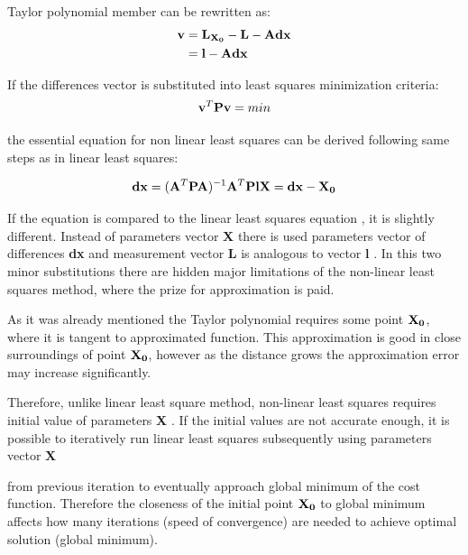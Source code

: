 \documentclass[a4paper,12pt]{article}
\newcommand{\ematr}[1]{
{\bf #1}
}
\newcommand{\evect}[1]{
{\bf #1}
}
\begin{document}
Taylor polynomial member can be rewritten as:
\begin{equation}
\begin{split}
\evect{v} &=  \evect{L_{X_{0}}} - \evect{L} - \ematr{A}\evect{dx} \\
          &= \evect{l} - \ematr{A}\evect{dx}
\end{split}
\end{equation}

If the differences vector is substituted into least squares minimization criteria:
\begin{equation}
\label{eq:min_cond}
\evect{v}^{T}  \ematr{P} \evect{v} = min
\end{equation}

the essential equation for non linear least squares can be derived 
following same steps as in linear least squares:

\begin{equation}
\label{eq:non_least_sq}
\evect{dx} = (\ematr{A}^{T} \ematr{P} \ematr{A})^{-1} \ematr{A}^{T} \ematr{P} \ematr{l}
\evect{X} =  {\evect{dx} -  \evect{X_{0}}}
\label{eq:least_sq}
\end{equation}

If the equation is compared to the linear least squares equation \label{eq:least_sq},
 it is slightly different. Instead of parameters vector \evect{X} there is used 
parameters vector of differences \evect{dx} and measurement vector \evect{L} is analogous to vector \evect{l}. In this two minor 
substitutions there are hidden major limitations of the non-linear least squares method, 
where the prize for approximation is paid. 

As it was already mentioned the Taylor polynomial requires some point $\evect{X_{0}}$, where it is tangent to 
approximated function.
This approximation is good in close surroundings of point $\evect{X_{0}}$, however as the distance 
grows the approximation error may increase significantly.

Therefore, unlike linear least square method, non-linear least squares requires initial 
value of parameters \evect{X}. If the initial values are not accurate 
enough, it is possible to iteratively run linear least squares subsequently using parameters vector \evect{X}
from previous iteration to eventually approach global minimum of the cost function. 
Therefore the closeness of the initial point $\evect{X_{0}}$ to global minimum affects how many iterations (speed of convergence)
are needed to achieve optimal solution (global minimum).
\end{document}
